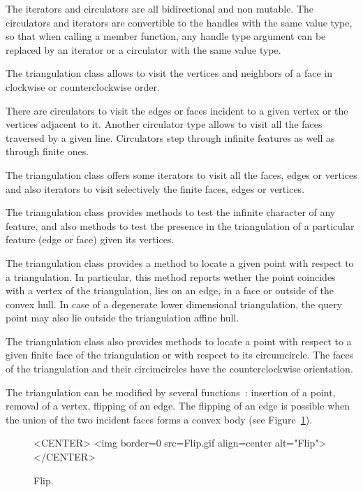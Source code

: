 The iterators and circulators
are all bidirectional and non mutable.
The circulators and iterators are convertible to the 
handles with the same value type, so that 
when calling a member function,
any handle type argument can be replaced
by an iterator or a circulator
with the same value type.

The triangulation class allows to visit the vertices
and  neighbors of a face in clockwise or counterclockwise order. 

There are circulators  
to visit the edges or faces 
incident to a given vertex or the  vertices 
adjacent to it.
Another circulator type allows to visit all the faces
traversed by a given line.
Circulators step through infinite features as well as 
through finite ones. 

The triangulation class offers 
some iterators to visit all the 
faces, edges or vertices and also iterators to visit 
selectively the finite
faces, edges  or vertices.



The triangulation class provides methods to test
the infinite character of any feature,
and also methods to test the presence in the triangulation
of a particular feature (edge or face) given its vertices.

The triangulation class  provides a method to locate
a given point with respect to a triangulation.
In particular, this method reports wether the point
coincides with a vertex of the triangulation, lies on an edge,
in a face or outside of the convex hull. In case of a degenerate 
lower dimensional triangulation, the query point may also lie
outside the triangulation affine hull.

The triangulation class also provides
methods to locate a point with respect to
a given  finite face of the triangulation or with respect to its
circumcircle.
The faces of the triangulation and their circimcircles 
have the  counterclockwise orientation.

The triangulation can be modified by several functions~:
insertion of a point, removal of a vertex,
flipping  of an edge. The flipping of an edge
is possible when the union of the two incident faces
forms  a convex body (see Figure~\ref{2D_Triangulation_fig_flip_bis}). 

\begin{figure}
\begin{ccTexOnly}
\begin{center} %

\end{center}
\end{ccTexOnly} 
\caption{Flip. \label{2D_Triangulation_fig_flip_bis}}
\begin{ccHtmlOnly}
<CENTER>
<img border=0 src=Flip.gif align=center alt="Flip">
</CENTER>
\end{ccHtmlOnly} 
\end{figure}


